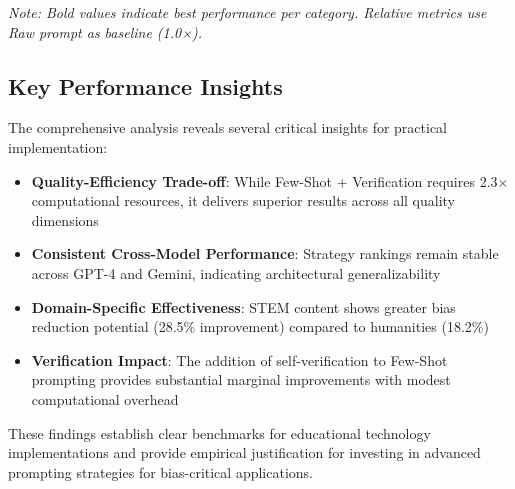\textit{Note: Bold values indicate best performance per category. Relative metrics use Raw prompt as baseline (1.0×).}

\subsection{Key Performance Insights}

The comprehensive analysis reveals several critical insights for practical implementation:

\begin{itemize}
    \item \textbf{Quality-Efficiency Trade-off}: While Few-Shot + Verification requires 2.3× computational resources, it delivers superior results across all quality dimensions
    \item \textbf{Consistent Cross-Model Performance}: Strategy rankings remain stable across GPT-4 and Gemini, indicating architectural generalizability  
    \item \textbf{Domain-Specific Effectiveness}: STEM content shows greater bias reduction potential (28.5\% improvement) compared to humanities (18.2\%)
    \item \textbf{Verification Impact}: The addition of self-verification to Few-Shot prompting provides substantial marginal improvements with modest computational overhead
\end{itemize}

These findings establish clear benchmarks for educational technology implementations and provide empirical justification for investing in advanced prompting strategies for bias-critical applications.